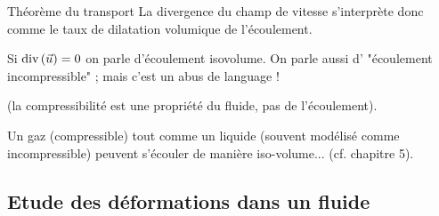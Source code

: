 \begin{frame}{Théorème du transport}
\smallskip
La divergence du champ de vitesse s'interprète donc comme le taux de dilatation volumique de l'écoulement.

Si $\mbox{\rm div}\, (\vec{u}) = 0$ on parle d'écoulement isovolume.
On parle aussi d' "écoulement incompressible" ; mais c'est un abus de language ! 

(la compressibilité est une propriété du fluide, pas de l'écoulement). 

Un gaz (compressible) tout comme un liquide (souvent modélisé comme incompressible) peuvent s'écouler de manière iso-volume... (cf. chapitre 5).


\end{frame}





  



\subsection{Etude des déformations dans un fluide}

